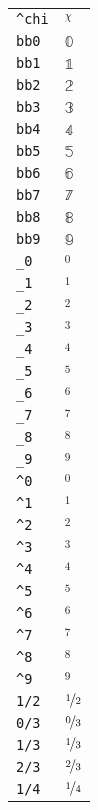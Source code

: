 \begin{longtable}{ll}
\texttt{\textasciicircum chi}&${}^\chi {}$\\
\texttt{bb0}&${}{\mathbb{0}}{}$\\
\texttt{bb1}&${}{\mathbb{1}}{}$\\
\texttt{bb2}&${}{\mathbb{2}}{}$\\
\texttt{bb3}&${}{\mathbb{3}}{}$\\
\texttt{bb4}&${}{\mathbb{4}}{}$\\
\texttt{bb5}&${}{\mathbb{5}}{}$\\
\texttt{bb6}&${}{\mathbb{6}}{}$\\
\texttt{bb7}&${}{\mathbb{7}}{}$\\
\texttt{bb8}&${}{\mathbb{8}}{}$\\
\texttt{bb9}&${}{\mathbb{9}}{}$\\
\texttt{\_0}&${}_0 {}$\\
\texttt{\_1}&${}_1 {}$\\
\texttt{\_2}&${}_2 {}$\\
\texttt{\_3}&${}_3 {}$\\
\texttt{\_4}&${}_4 {}$\\
\texttt{\_5}&${}_5 {}$\\
\texttt{\_6}&${}_6 {}$\\
\texttt{\_7}&${}_7 {}$\\
\texttt{\_8}&${}_8 {}$\\
\texttt{\_9}&${}_9 {}$\\
\texttt{\textasciicircum 0}&${}^0 {}$\\
\texttt{\textasciicircum 1}&${}^1 {}$\\
\texttt{\textasciicircum 2}&${}^2 {}$\\
\texttt{\textasciicircum 3}&${}^3 {}$\\
\texttt{\textasciicircum 4}&${}^4 {}$\\
\texttt{\textasciicircum 5}&${}^5 {}$\\
\texttt{\textasciicircum 6}&${}^6 {}$\\
\texttt{\textasciicircum 7}&${}^7 {}$\\
\texttt{\textasciicircum 8}&${}^8 {}$\\
\texttt{\textasciicircum 9}&${}^9 {}$\\
\texttt{1/2}&${}\nicefrac{1}{2} {}$\\
\texttt{0/3}&${}\nicefrac{0}{3} {}$\\
\texttt{1/3}&${}\nicefrac{1}{3} {}$\\
\texttt{2/3}&${}\nicefrac{2}{3} {}$\\
\texttt{1/4}&${}\nicefrac{1}{4} {}$\\

\end{longtable}
